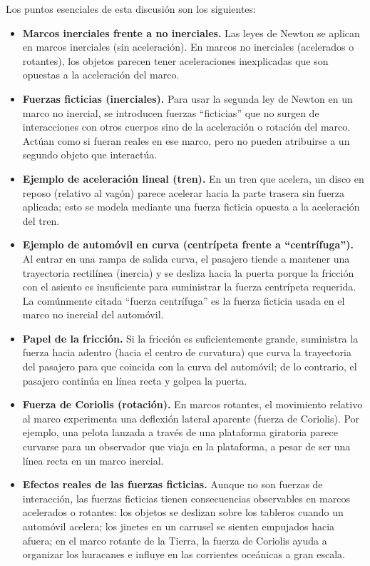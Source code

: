 Los puntos esenciales de esta discusión son los siguientes:

\begin{itemize}
\item \textbf{Marcos inerciales frente a no inerciales.} Las leyes de Newton se aplican en marcos inerciales (sin aceleración). En marcos no inerciales (acelerados o rotantes), los objetos parecen tener aceleraciones inexplicadas que son opuestas a la aceleración del marco.

\item \textbf{Fuerzas ficticias (inerciales).} Para usar la segunda ley de Newton en un marco no inercial, se introducen fuerzas ``ficticias'' que no surgen de interacciones con otros cuerpos sino de la aceleración o rotación del marco. Actúan como si fueran reales en ese marco, pero no pueden atribuirse a un segundo objeto que interactúa.

\item \textbf{Ejemplo de aceleración lineal (tren).} En un tren que acelera, un disco en reposo (relativo al vagón) parece acelerar hacia la parte trasera sin fuerza aplicada; esto se modela mediante una fuerza ficticia opuesta a la aceleración del tren.

\item \textbf{Ejemplo de automóvil en curva (centrípeta frente a ``centrífuga'').} Al entrar en una rampa de salida curva, el pasajero tiende a mantener una trayectoria rectilínea (inercia) y se desliza hacia la puerta porque la fricción con el asiento es insuficiente para suministrar la fuerza centrípeta requerida. La comúnmente citada ``fuerza centrífuga'' es la fuerza ficticia usada en el marco no inercial del automóvil.

\item \textbf{Papel de la fricción.} Si la fricción es suficientemente grande, suministra la fuerza hacia adentro (hacia el centro de curvatura) que curva la trayectoria del pasajero para que coincida con la curva del automóvil; de lo contrario, el pasajero continúa en línea recta y golpea la puerta.

\item \textbf{Fuerza de Coriolis (rotación).} En marcos rotantes, el movimiento relativo al marco experimenta una deflexión lateral aparente (fuerza de Coriolis). Por ejemplo, una pelota lanzada a través de una plataforma giratoria parece curvarse para un observador que viaja en la plataforma, a pesar de ser una línea recta en un marco inercial.

\item \textbf{Efectos reales de las fuerzas ficticias.} Aunque no son fuerzas de interacción, las fuerzas ficticias tienen consecuencias observables en marcos acelerados o rotantes: los objetos se deslizan sobre los tableros cuando un automóvil acelera; los jinetes en un carrusel se sienten empujados hacia afuera; en el marco rotante de la Tierra, la fuerza de Coriolis ayuda a organizar los huracanes e influye en las corrientes oceánicas a gran escala.
\end{itemize}

